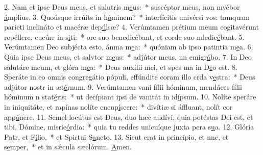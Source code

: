 2. Nam et ipse Deus meus, et salutris m\uline{e}us:~* suscéptor meus, non mvébor \uline{á}mplius.
3. Quoúsque irrúits in h\uline{ó}minem?~* interfícitis univérsi vos: tamquam paríeti inclináto et macéræ dep\uline{ú}lsæ?
4. Verúmtamen prétium meum cogitavérunt repéllere, cucúrr in s\uline{i}ti:~* ore suo benedicébant, et corde suo mledic\uline{é}bant.
5. Verúmtamen Deo subjécta esto, ánma m\uline{e}a:~* quóniam ab ipso patintia m\uline{e}a.
6. Quia ipse Deus meus, et salvtor m\uline{e}us:~* adjútor meus, nn emigr\uline{á}bo.
7. In Deo salutáre meum, et glóra m\uline{e}a:~* Deus auxílii mei, et spes ma in D\uline{e}o est.
8. Speráte in eo omnis congregátio pópuli, effúndite coram illo crda v\uline{e}stra:~* Deus adjútor nostr in æt\uline{é}rnum.
9. Verúmtamen vani fílii hóminum, mendáces fílii hóminum n stat\uline{é}ris:~* ut decípiant ipsi de vanitát in id\uline{í}psum.
10. Nolíte speráre in iniquitáte, et rapínas nolíte cncup\uline{í}scere:~* divítiæ si áffluant, nolít cor app\uline{ó}nere.
11. Semel locútus est Deus, duo hæc audívi, quia potéstas Dei est, et tibi, Dómine, misric\uline{ó}rdia:~* quia tu reddes unicuíque juxta pera s\uline{u}a.
12. Glória Patr, et F\uline{í}lio,~* et Spirtui S\uline{a}ncto.
13. Sicut erat in princípio, et nnc, et s\uline{e}mper,~* et in sǽcula sæclórum. \uline{A}men.
